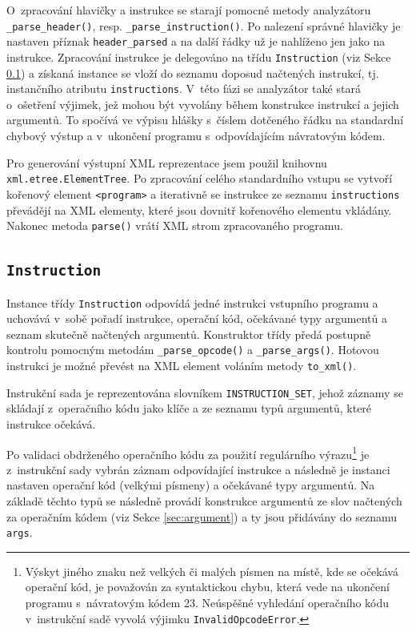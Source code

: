 \documentclass{article}[a4paper]
\begin{document}
    O~zpracování hlavičky a instrukce se starají pomocné metody analyzátoru \texttt{\_parse\_header()}, resp. \texttt{\_parse\_instruction()}.
    Po nalezení správné hlavičky je nastaven příznak \texttt{header\_parsed} a na další řádky už je nahlíženo jen jako na instrukce.
    Zpracování instrukce je delegováno na třídu \texttt{Instruction} (viz Sekce \ref{sec:instruction}) a získaná instance se vloží
    do seznamu doposud načtených instrukcí, tj. instančního atributu \texttt{instructions}.
    V~této fázi se analyzátor také stará o~ošetření výjimek, jež mohou být vyvolány během konstrukce instrukcí a jejich argumentů.
    To spočívá ve výpisu hlášky s~číslem dotčeného řádku na standardní chybový výstup a v~ukončení programu s~odpovídajícím návratovým kódem.

    Pro generování výstupní XML reprezentace jsem použil knihovnu \texttt{xml.etree.ElementTree}.
    Po zpracování celého standardního vstupu se vytvoří kořenový element \texttt{<program>} a iterativně se instrukce ze seznamu \texttt{instructions}
    převádějí na XML elementy, které jsou dovnitř kořenového elementu vkládány.
    Nakonec metoda \texttt{parse()} vrátí XML strom zpracovaného programu.

    \subsection{\texttt{Instruction}}
    \label{sec:instruction}

    Instance třídy \texttt{Instruction} odpovídá jedné instrukci vstupního programu a uchovává v~sobě pořadí instrukce, operační kód, očekávané typy argumentů a seznam skutečně načtených argumentů.
    Konstruktor třídy předá postupně kontrolu pomocným metodám \texttt{\_parse\_opcode()} a \texttt{\_parse\_args()}.
    Hotovou instrukci je možné převést na XML element voláním metody \texttt{to\_xml()}.

    Instrukční sada je reprezentována slovníkem \texttt{INSTRUCTION\_SET}, jehož záznamy se skládají z~operačního kódu jako klíče a ze seznamu typů argumentů, které instrukce očekává.

    Po validaci obdrženého operačního kódu za použití regulárního výrazu\footnote{Výskyt jiného znaku než velkých či malých písmen na místě, kde se očekává operační kód, je považován za syntaktickou chybu,
    která vede na ukončení programu s~návratovým kódem 23. Neúspěšné vyhledání operačního kódu v~instrukční sadě vyvolá výjimku \texttt{InvalidOpcodeError}.}
    je z~instrukční sady vybrán záznam odpovídající instrukce a následně je instanci nastaven operační kód (velkými písmeny) a očekávané typy argumentů.
    Na základě těchto typů se následně provádí konstrukce argumentů ze slov načtených za operačním kódem (viz Sekce \ref{sec:argument}) a ty jsou přidávány do seznamu \texttt{args}.
\end{document}
